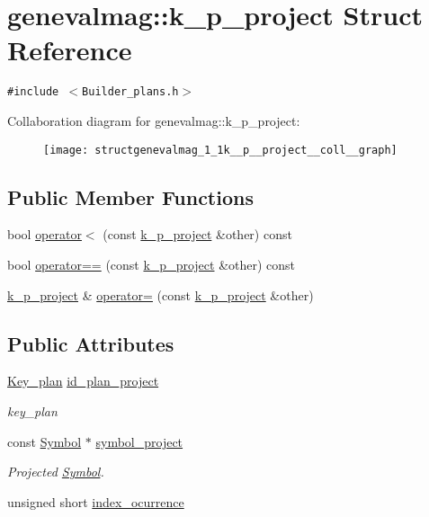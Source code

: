\hypertarget{structgenevalmag_1_1k__p__project}{
\section{genevalmag::k\_\-p\_\-project Struct Reference}
\label{structgenevalmag_1_1k__p__project}
}
{\tt \#include $<$Builder\_\-plans.h$>$}

Collaboration diagram for genevalmag::k\_\-p\_\-project:\nopagebreak
\begin{figure}[H]
\begin{center}
\leavevmode
\texttt{[image: structgenevalmag\_1\_1k\_\_p\_\_project\_\_coll\_\_graph]}
\end{center}
\end{figure}
\subsection*{Public Member Functions}
\begin{CompactItemize}
\item 
bool \hyperlink{structgenevalmag_1_1k__p__project_4a06d269aa9b57fb5579757fad027c3f}{operator$<$} (const \hyperlink{structgenevalmag_1_1k__p__project}{k\_\-p\_\-project} \&other) const 
\item 
bool \hyperlink{structgenevalmag_1_1k__p__project_277ca3092cf5e354a88ee0d63ac4bc25}{operator==} (const \hyperlink{structgenevalmag_1_1k__p__project}{k\_\-p\_\-project} \&other) const 
\item 
\hyperlink{structgenevalmag_1_1k__p__project}{k\_\-p\_\-project} \& \hyperlink{structgenevalmag_1_1k__p__project_e64d4643b5a6e52389a540b5725dc148}{operator=} (const \hyperlink{structgenevalmag_1_1k__p__project}{k\_\-p\_\-project} \&other)
\end{CompactItemize}
\subsection*{Public Attributes}
\begin{CompactItemize}
\item 
\hyperlink{structgenevalmag_1_1k__plan}{Key\_\-plan} \hyperlink{structgenevalmag_1_1k__p__project_fc065645098439a308c5ca879e5e5a51}{id\_\-plan\_\-project}
\begin{CompactList}\small\item\em key\_\-plan \item\end{CompactList}\item 
const \hyperlink{classgenevalmag_1_1Symbol}{Symbol} $\ast$ \hyperlink{structgenevalmag_1_1k__p__project_64f5efd91847bd333263c799360dd0b5}{symbol\_\-project}
\begin{CompactList}\small\item\em Projected \hyperlink{classgenevalmag_1_1Symbol}{Symbol}. \item\end{CompactList}\item 
unsigned short \hyperlink{structgenevalmag_1_1k__p__project_42b98a1d22cb7215bdc7a0432f94cbcc}{index\_\-ocurrence}
\end{CompactItemize}


